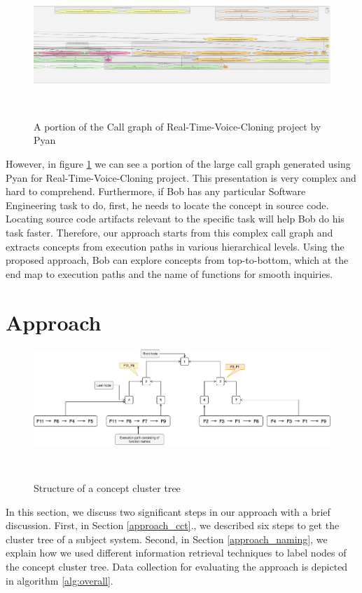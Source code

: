 \begin{figure}[tb]
  \centering
  \includegraphics[width=\columnwidth]{figures/hla1/realTime.png}
  \caption{A portion of the Call graph of Real-Time-Voice-Cloning project by Pyan}~\label{fig:realTime}
\end{figure}

However, in figure \ref{fig:realTime} we can see a portion of the large call graph generated using Pyan \cite{pyan} for Real-Time-Voice-Cloning \cite{realTime} project. This presentation is very complex and hard to comprehend. Furthermore, if Bob has any particular Software Engineering task to do, first, he needs to locate the concept in source code. Locating source code artifacts relevant to the specific task will help Bob do his task faster. Therefore, our approach starts from this complex call graph and extracts concepts from execution paths in various hierarchical levels. Using the proposed approach, Bob can explore concepts from top-to-bottom, which at the end map to execution paths and the name of functions for smooth inquiries. 


 
 
\section{Approach}

\begin{figure}[tb]
  \centering
  \includegraphics[width=\columnwidth]{figures/hla1/visual_tool_static_call_graph-2.png}
  \caption{Structure of a concept cluster tree}~\label{fig:hla1_motivation}
\end{figure}
In this section, we discuss two significant steps in our approach with a brief discussion. First, in Section \ref{approach_cct}., we described six steps to get the cluster tree of a subject system. Second, in Section \ref{approach_naming}, we explain how we used different information retrieval techniques to label nodes of the concept cluster tree. Data collection for evaluating the approach is depicted in algorithm \ref{alg:overall}.


